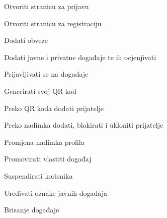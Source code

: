 			
			\begin{packed_enum}
				\item  {}
				
				\begin{packed_enum}
					
					\item 	Otvoriti stranicu za prijavu
					\item 	Otvoriti stranicu za registraciju
					
					
				\end{packed_enum}
			
				\item  {}
				
				\begin{packed_enum}
					
					\item Dodati obveze
					\item Dodati javne i privatne događaje te ih ocjenjivati
					\item Prijavljivati se na događaje
					\item Generirati svoj QR kod
					\item Preko QR koda dodati prijatelje
					\item Preko nadimka dodati, blokirati i ukloniti prijatelje
					\item Promjena nadimka profila
					
				\end{packed_enum}
			
				\item  {}
				
				\begin{packed_enum}
					
					\item Promovirati vlastiti događaj
			
					
				\end{packed_enum}
			
				\item  {}
				
				\begin{packed_enum}
					
					\item Suspendirati korisnika
					\item Uređivati oznake javnih događaja
					\item Brisanje događaje
					

\end{packed_enum}
\end{packed_enum}
